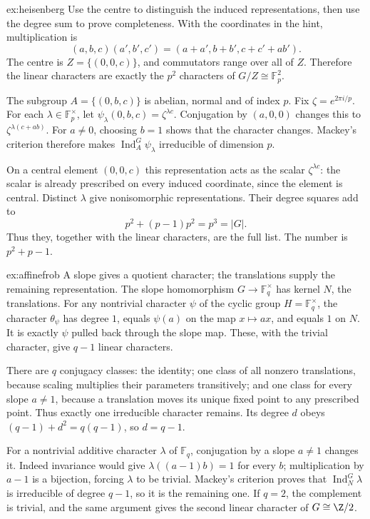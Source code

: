 \begin{solution}{ex:heisenberg}
\idea Use the centre to distinguish the induced representations, then use the degree sum to prove completeness.
\writeup With the coordinates in the hint, multiplication is
\[
(a,b,c)(a',b',c')=(a+a',b+b',c+c'+ab').
\]
The centre is $Z=\{(0,0,c)\}$, and commutators range over all of $Z$. Therefore the linear characters are exactly the $p^2$ characters of $G/Z\cong\mathbb F_p^2$.

The subgroup $A=\{(0,b,c)\}$ is abelian, normal and of index $p$. Fix $\zeta=e^{2\pi i/p}$. For each $\lambda\in\mathbb F_p^\times$, let
$\psi_\lambda(0,b,c)=\zeta^{\lambda c}$.
Conjugation by $(a,0,0)$ changes this to $\zeta^{\lambda(c+ab)}$. For $a\ne0$, choosing $b=1$ shows that the character changes. Mackey's criterion therefore makes $\operatorname{Ind}_A^G\psi_\lambda$ irreducible of dimension $p$.

On a central element $(0,0,c)$ this representation acts as the scalar $\zeta^{\lambda c}$: the scalar is already prescribed on every induced coordinate, since the element is central. Distinct $\lambda$ give nonisomorphic representations. Their degree squares add to
\[
p^2+(p-1)p^2=p^3=|G|.
\]
Thus they, together with the linear characters, are the full list. The number is $p^2+p-1$.
\end{solution}

\begin{solution}{ex:affinefrob}
\idea A slope gives a quotient character; the translations supply the remaining representation.
\writeup The slope homomorphism $G\to\mathbb F_q^\times$ has kernel $N$, the translations. For any nontrivial character $\psi$ of the cyclic group $H=\mathbb F_q^\times$, the character $\theta_\psi$ has degree $1$, equals $\psi(a)$ on the map $x\mapsto ax$, and equals $1$ on $N$. It is exactly $\psi$ pulled back through the slope map. These, with the trivial character, give $q-1$ linear characters.

There are $q$ conjugacy classes: the identity; one class of all nonzero translations, because scaling multiplies their parameters transitively; and one class for every slope $a\ne1$, because a translation moves its unique fixed point to any prescribed point. Thus exactly one irreducible character remains. Its degree $d$ obeys
$(q-1)+d^2=q(q-1)$, so $d=q-1$.

For a nontrivial additive character $\lambda$ of $\mathbb F_q$, conjugation by a slope $a\ne1$ changes it. Indeed invariance would give $\lambda((a-1)b)=1$ for every $b$; multiplication by $a-1$ is a bijection, forcing $\lambda$ to be trivial. Mackey's criterion proves that $\operatorname{Ind}_N^G\lambda$ is irreducible of degree $q-1$, so it is the remaining one. If $q=2$, the complement is trivial, and the same argument gives the second linear character of $G\cong\Z/2$.
\end{solution}

